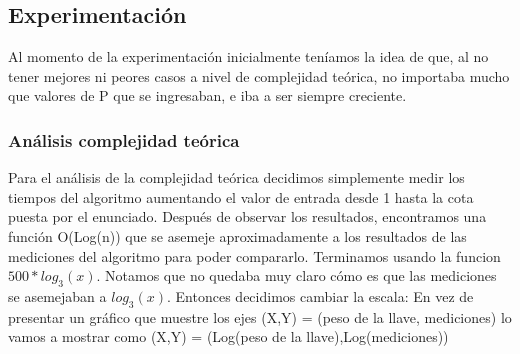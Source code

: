 \documentclass[spanish,12pt]{article}
\begin{document}
{%




\subsection{Experimentación}
 Al momento de la experimentación inicialmente teníamos la idea de que, al no tener mejores ni peores casos a nivel de complejidad teórica, no importaba mucho que valores de P que se ingresaban, e iba a ser siempre creciente.

\subsubsection{Análisis complejidad te\'orica}
 Para el análisis de la complejidad te\'orica decidimos simplemente medir los tiempos del algoritmo aumentando el valor de entrada desde 1 hasta la cota puesta por el enunciado.
  Después de observar los resultados, encontramos una función O(Log(n)) que se asemeje aproximadamente a los resultados de las mediciones del algoritmo para poder compararlo.
  Terminamos usando la funcion $500*log_3(x)$.
  Notamos que no quedaba muy claro cómo es que las mediciones se asemejaban a $log_3(x)$. Entonces decidimos cambiar la escala:
  En vez de presentar un gráfico que muestre los ejes (X,Y) = (peso de la llave, mediciones) lo vamos a mostrar como (X,Y) = (Log(peso de la llave),Log(mediciones))

}
\end{document}

